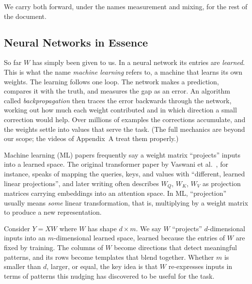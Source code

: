 \documentclass[11pt]{article}
\newcommand{\meas}[1]{\textcolor{measink}{#1}}
\newcommand{\mix}[1]{\textcolor{mixink}{#1}}
\begin{document}
We carry both forward, under the names \meas{measurement} and \mix{mixing}, for the rest of the document.

\subsection*{Neural Networks in Essence}

So far $W$ has simply been given to us. In a neural network its entries are \emph{learned}. This is what the name \emph{machine learning} refers to, a machine that learns its own weights. The learning follows one loop. The network makes a prediction, compares it with the truth, and measures the gap as an error. An algorithm called \emph{backpropagation} then traces the error backwards through the network, working out how much each weight contributed and in which direction a small correction would help. Over millions of examples the corrections accumulate, and the weights settle into values that serve the task. (The full mechanics are beyond our scope; the videos of Appendix~A treat them properly.)

Machine learning (ML) papers frequently say a weight matrix ``projects'' inputs into a
learned space. The original transformer paper by Vaswani et al.\
\citeyearpar{vaswani2017attention}, for instance, speaks of mapping the
queries, keys, and values with ``different, learned linear projections'',
and later writing often describes $W_Q$, $W_K$, $W_V$ as projection
matrices carrying embeddings into an attention space. In ML, ``projection'' usually means \textit{some} linear
transformation, that is, multiplying by a weight matrix to produce a new
representation.

Consider $Y = XW$ where $W$ has shape $d \times m$. We say $W$ ``projects''
$d$-dimensional inputs into an $m$-dimensional learned space, learned because the
entries of $W$ are fixed by training. The \meas{columns} of $W$ become directions
that detect meaningful patterns, and its \mix{rows} become templates that blend
together. Whether $m$ is smaller than $d$, larger, or equal, the key idea is that $W$ re-expresses inputs in terms of
patterns this nudging has discovered to be useful for the task.
\end{document}
